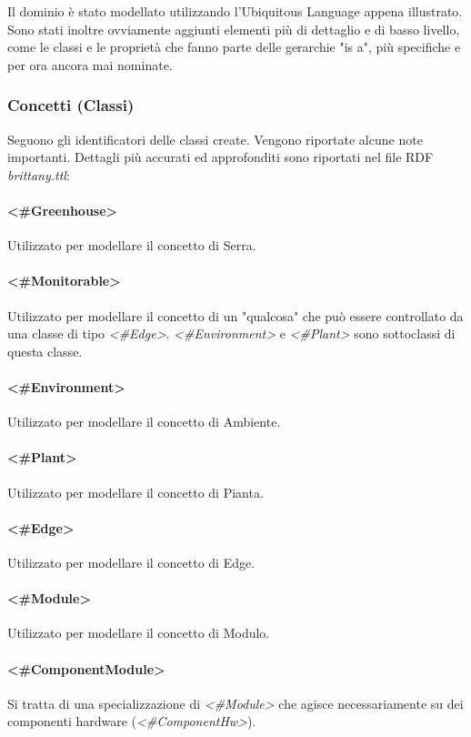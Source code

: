 
\noindent Il dominio è stato modellato utilizzando l'Ubiquitous Language appena illustrato. Sono stati inoltre ovviamente aggiunti elementi più di dettaglio e di basso livello, come le classi e le proprietà che fanno parte delle gerarchie "is a", più specifiche e per ora ancora mai nominate.
\subsubsection{Concetti (Classi)}
Seguono gli identificatori delle classi create. Vengono riportate alcune note importanti. Dettagli più accurati ed approfonditi sono riportati nel file RDF \textit{brittany.ttl}:

\paragraph{<\#Greenhouse>}
Utilizzato per modellare il concetto di Serra.
\paragraph{<\#Monitorable>}
Utilizzato per modellare il concetto di un "qualcosa" che può essere controllato da una classe di tipo \textit{<\#Edge>}. \textit{<\#Environment>} e \textit{<\#Plant>} sono sottoclassi di questa classe.
\paragraph{<\#Environment>}
Utilizzato per modellare il concetto di Ambiente.
\paragraph{<\#Plant>}
Utilizzato per modellare il concetto di Pianta.
\paragraph{<\#Edge>}
Utilizzato per modellare il concetto di Edge.
\paragraph{<\#Module>}
Utilizzato per modellare il concetto di Modulo.
\paragraph{<\#ComponentModule>}
Si tratta di una specializzazione di \textit{<\#Module>} che agisce necessariamente su dei componenti hardware (\textit{<\#ComponentHw>}).
